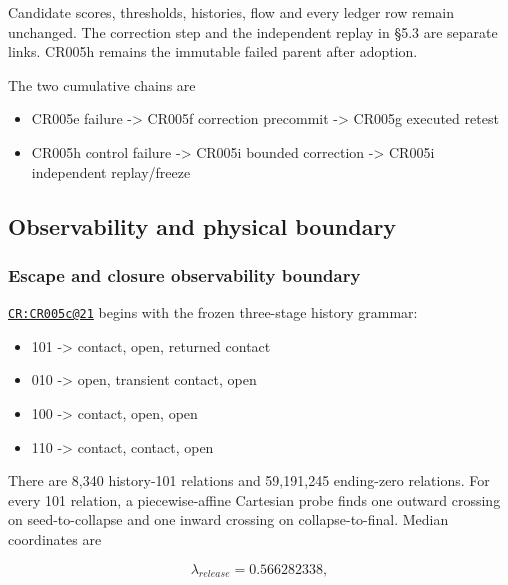 Candidate scores, thresholds, histories, flow and every ledger row
remain unchanged. The correction step and the independent replay in §5.3
are separate links. CR005h remains the immutable failed parent after
adoption.

The two cumulative chains are

\begin{itemize}
\tightlist
\item
  CR005e failure -\textgreater{} CR005f correction precommit
  -\textgreater{} CR005g executed retest
\item
  CR005h control failure -\textgreater{} CR005i bounded correction
  -\textgreater{} CR005i independent replay/freeze
\end{itemize}

\subsection{Observability and physical
boundary}\label{viii-ch08-observability-and-physical-boundary}

\subsubsection{Escape and closure observability
boundary}\label{viii-ch08-escape-and-closure-observability-boundary}

\href{https://github.com/iwtbotiwtwot/SAMA/blob/4c2b5dc1649da5900c90b90d0ce56c223dbb7717/tests/courtroom/21-gravitational-waves-cr005c-starbreaker-escape-closure-observability-gate/README.md}{\texttt{CR:CR005c@21}}
begins with the frozen three-stage history grammar:

\begin{itemize}
\tightlist
\item
  101 -\textgreater{} contact, open, returned contact
\item
  010 -\textgreater{} open, transient contact, open
\item
  100 -\textgreater{} contact, open, open
\item
  110 -\textgreater{} contact, contact, open
\end{itemize}

There are 8,340 history-101 relations and 59,191,245 ending-zero
relations. For every 101 relation, a piecewise-affine Cartesian probe
finds one outward crossing on seed-to-collapse and one inward crossing
on collapse-to-final. Median coordinates are

\[
\lambda_{release}=0.566282338,
\]

